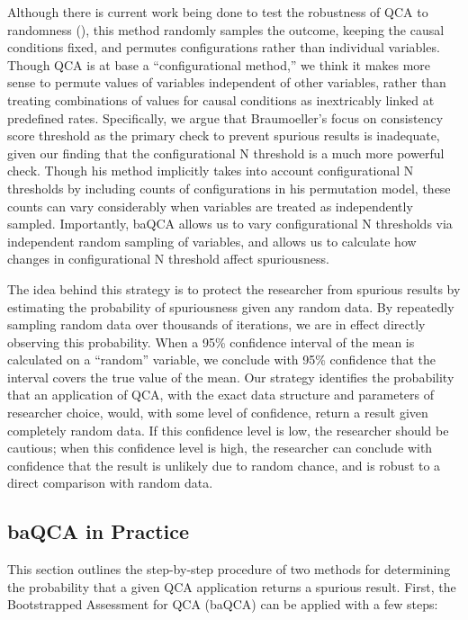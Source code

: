 \documentclass[12pt]{article}
\begin{document}
{Although there is current work being done to test the robustness of QCA to randomness (\citealt{braumoeller_2015,braumoeller_2015data}), this method randomly samples the outcome, keeping the causal conditions fixed, and permutes configurations rather than individual variables. Though QCA is at base a ``configurational method,'' we think it makes more sense to permute values of variables independent of other variables, rather than treating combinations of values for causal conditions as inextricably linked at predefined rates. Specifically, we argue that Braumoeller's focus on consistency score threshold as the primary check to prevent spurious results is inadequate, given our finding that the configurational N threshold is a much more powerful check. Though his method implicitly takes into account configurational N thresholds by including counts of configurations in his permutation model, these counts can vary considerably when variables are treated as independently sampled. Importantly, baQCA allows us to vary configurational N thresholds via independent random sampling of variables, and allows us to calculate how changes in configurational N threshold affect spuriousness. 

The idea behind this strategy is to protect the researcher from spurious results by estimating the probability of spuriousness given any random data. By repeatedly sampling random data over thousands of iterations, we are in effect directly observing this probability. When a 95\% confidence interval of the mean is calculated on a ``random'' variable, we conclude with 95\% confidence that the interval covers the true value of the mean. Our strategy identifies the probability that an application of QCA, with the exact data structure and parameters of researcher choice, would, with some level of confidence, return a result given completely random data. If this confidence level is low, the researcher should be cautious; when this confidence level is high, the researcher can conclude with confidence that the result is unlikely due to random chance, and is robust to a direct comparison with random data. 



\subsection{baQCA in Practice}

This section outlines the step-by-step procedure of two methods for determining the probability that a given QCA application returns a spurious result. First, the Bootstrapped Assessment for QCA (baQCA) can be applied with a few steps: 

}
\end{document}
